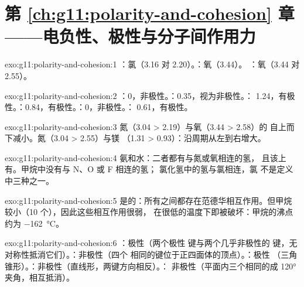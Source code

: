 \section*{第 \ref{ch:g11:polarity-and-cohesion} 章——电负性、极性与分子间作用力}

\begin{solution}{exo:g11:polarity-and-cohesion:1}
：氯（3.16 对 2.20）。：氧（3.44）。
：氧（3.44 对 2.55）。
\end{solution}

\begin{solution}{exo:g11:polarity-and-cohesion:2}
：0，非极性。：0.35，视为非极性。：
1.24，有极性。：0.84，有极性。：0，非极性。：
0.61，有极性。
\end{solution}

\begin{solution}{exo:g11:polarity-and-cohesion:3}
氮（3.04 > 2.19）与氧（3.44 > 2.58）的
自上而下减小。氮（3.04 > 2.55）与镁
（1.31 > 0.93）：沿周期从左到右增大。
\end{solution}

\begin{solution}{exo:g11:polarity-and-cohesion:4}
氨和水：二者都有与氮或氧相连的氢，
且该上有。甲烷中没有与 N、O 或 F 相连的氢；
氯化氢中的氢与氯相连，氯
不是定义中三种之一。
\end{solution}

\begin{solution}{exo:g11:polarity-and-cohesion:5}
是的：所有之间都存在范德华相互作用。但甲烷
较小（10 个），因此这些相互作用很弱，
在很低的温度下即被破坏：甲烷的沸点约为
\qty{-162}{\celsius}。
\end{solution}

\begin{solution}{exo:g11:polarity-and-cohesion:6}
：极性（两个极性  键与两个几乎非极性的
 键，无对称性抵消它们）。：非极性（四个
相同的键位于正四面体的顶点）。：极性
（三角锥形）。：非极性（直线形，两键方向相反）。：
非极性（平面内三个相同的成 \ang{120} 夹角，相互抵消）。
\end{solution}

